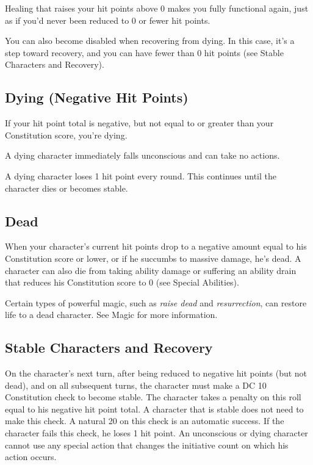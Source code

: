 Healing that raises your hit points above 0 makes you fully functional again, just as if you'd never been reduced to 0 or fewer hit points.
				
You can also become disabled when recovering from dying. In this case, it's a step toward recovery, and you can have fewer than 0 hit points (see Stable Characters and Recovery).
				
\subsection{Dying (Negative Hit Points)}

				
If your hit point total is negative, but not equal to or greater than your Constitution score, you're dying.
				
A dying character immediately falls unconscious and can take no actions.
				
A dying character loses 1 hit point every round. This continues until the character dies or becomes stable.
				
\subsection{Dead}

				
When your character's current hit points drop to a negative amount equal to his Constitution score or lower, or if he succumbs to massive damage, he's dead. A character can also die from taking ability damage or suffering an ability drain that reduces his Constitution score to 0 (see Special Abilities).
				
Certain types of powerful magic, such as \textit{raise dead} and \textit{resurrection}, can restore life to a dead character. See Magic for more information.
				
\subsection{Stable Characters and Recovery}

				
On the character's next turn, after being reduced to negative hit points (but not dead), and on all subsequent turns, the character must make a DC 10 Constitution check to become stable. The character takes a penalty on this roll equal to his negative hit point total. A character that is stable does not need to make this check. A natural 20 on this check is an automatic success. If the character fails this check, he loses 1 hit point. An unconscious or dying character cannot use any special action that changes the initiative count on which his action occurs.
				
